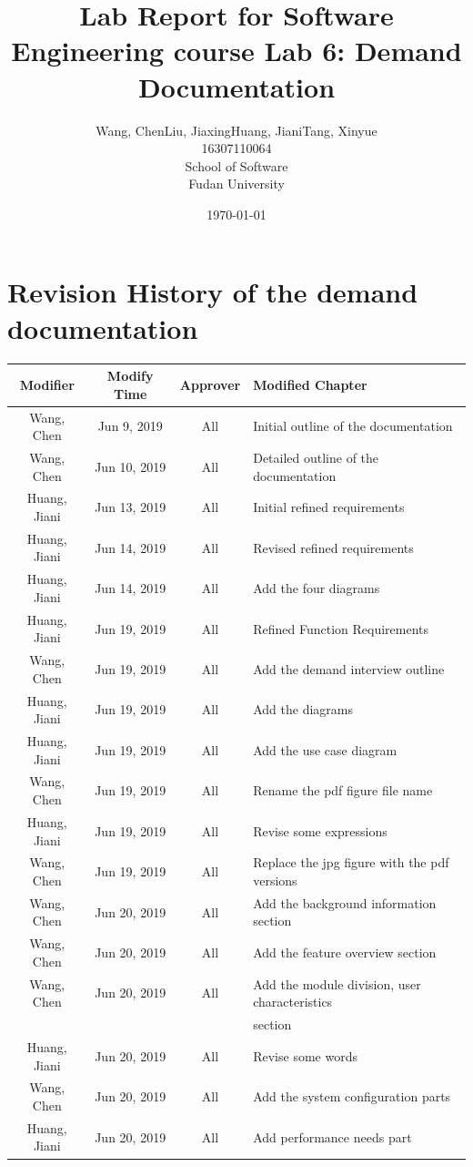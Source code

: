 \documentclass[a4paper]{report}
\title{Lab Report for Software Engineering course \newline
 Lab 6: Demand Documentation}
\author{Wang, Chen\qquad Liu, Jiaxing\qquad Huang, Jiani\qquad Tang, Xinyue \\
16307110064\qquad17302010049\qquad 17302010063\qquad 16307110476 \\
School of Software\\
Fudan University
}
\date{\today}
\begin{document}
\maketitle

\tableofcontents
\chapter{Revision History of the demand documentation}

\begin{tabular}{|c|c|c|l|}
\hline 
Modifier&Modify Time&Approver&Modified Chapter\\
\hline  
Wang, Chen&Jun 9, 2019&All&Initial outline of the documentation\\
\hline 
Wang, Chen&Jun 10, 2019&All&Detailed outline of the documentation\\
\hline 
Huang, Jiani&Jun 13, 2019&All&Initial refined requirements\\
\hline 
Huang, Jiani&Jun 14, 2019&All&Revised refined requirements\\
\hline 
Huang, Jiani&Jun 14, 2019&All&Add the four diagrams\\
\hline 
Huang, Jiani&Jun 19, 2019&All&Refined Function Requirements\\
\hline 
Wang, Chen&Jun 19, 2019&All&Add the demand interview outline\\
\hline
Huang, Jiani&Jun 19, 2019&All&Add the diagrams\\
\hline
Huang, Jiani&Jun 19, 2019&All&Add the use case diagram\\
\hline
Wang, Chen&Jun 19, 2019&All&Rename the pdf figure file name\\
\hline
Huang, Jiani&Jun 19, 2019&All&Revise some expressions\\
\hline
Wang, Chen&Jun 19, 2019&All&Replace the jpg figure with the pdf versions\\
\hline
Wang, Chen&Jun 20, 2019&All&Add the background information section\\
\hline
Wang, Chen&Jun 20, 2019&All&Add the feature overview section\\
\hline
Wang, Chen&Jun 20, 2019&All&Add the module division, user characteristics \\
& & & section\\
\hline
Huang, Jiani&Jun 20, 2019&All&Revise some words\\
\hline
Wang, Chen&Jun 20, 2019&All&Add the system configuration parts\\
\hline
Huang, Jiani&Jun 20, 2019&All&Add performance needs part\\

\end{tabular}
\end{document}
